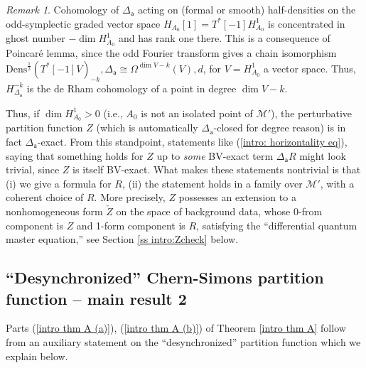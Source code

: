 \documentclass[11pt,a4paper]{amsart}
\theoremstyle{plain} %
\theoremstyle{definition}
\theoremstyle{remark}
\newtheorem{rem}[thm]{Remark}
\newcommand{\mr}{\mathrm}
\newcommand{\sfa}{\mathsf{a}}
\newcommand{\M}{\mathcal{M}}
\begin{document}
\begin{rem}
\label{rem: Poincare lemma}
Cohomology of $\Delta_\sfa$ acting on (formal or smooth) half-densities on the odd-symplectic graded vector space $H_{A_0}[1]=T^*[-1]H^1_{A_0}$ is concentrated in ghost number $-\dim H^1_{A_0}$ and has rank one there. This is a consequence of Poincar\'e lemma, since the odd Fourier transform gives a chain isomorphism $\mr{Dens}^{\frac12}(T^*[-1]V)_{-k},\Delta_\sfa \cong \Omega^{\dim V-k}(V),d$, for $V=H^1_{A_0}$ a vector space. Thus, $H_{\Delta_\sfa}^{-k}$ is the de Rham cohomology of a point in degree $\dim V-k$.

Thus, if $\dim H^1_{A_0}>0$ (i.e., $A_0$ is not an isolated point of $\M'$), the perturbative partition function $Z$ (which is automatically $\Delta_\sfa$-closed for degree reason) is in fact $\Delta_\sfa$-exact. From this standpoint, statements like (\ref{intro: horizontality eq}), saying that something holds for $Z$ up to \emph{some} BV-exact term $\Delta_\sfa R$ might look trivial, since $Z$ is itself BV-exact. What makes these statements nontrivial is that (i) we give a formula for $R$, (ii) the statement holds in a family over $\M'$, with a coherent choice of $R$.
More precisely, $Z$ possesses an extension to a nonhomogeneous form $\check{Z}$ on the space of background data, whose 0-from component is $Z$ and 1-form component is $R$, satisfying the ``differential quantum master equation,'' see Section \ref{ss intro:Zcheck} below.
%
\end{rem}


\subsection{``Desynchronized'' Chern-Simons partition function -- main result 2}
Parts (\ref{intro thm A (a)}), (\ref{intro thm A (b)}) of Theorem \ref{intro thm A} follow from an auxiliary statement on the ``desynchronized'' partition function which we explain below.
\end{document}
